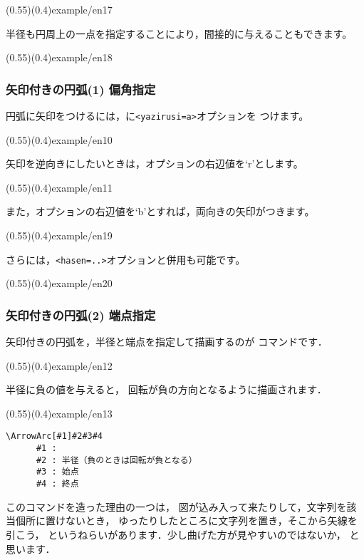 \showexample[両端の間接的指定](0.55)(0.4){example/en17}

半径も円周上の一点を指定することにより，間接的に与えることもできます。

\showexample[半径の間接的指定](0.55)(0.4){example/en18}

\subsubsection{矢印付きの円弧(1) 偏角指定}
円弧に矢印をつけるには，に\verb+<yazirusi=a>+オプションを
つけます。

\showexample[\texttt{<yazirusi=a>}](0.55)(0.4){example/en10}

矢印を逆向きにしたいときは，オプションの右辺値を`r'とします。

\showexample[\texttt{<yazirusi=r>}](0.55)(0.4){example/en11}

また，オプションの右辺値を`b'とすれば，両向きの矢印がつきます。

\showexample[\texttt{<yazirusi=b>}](0.55)(0.4){example/en19}

さらには，\verb+<hasen=..>+オプションと併用も可能です。

\showexample[\texttt{<yazirusi=b>}](0.55)(0.4){example/en20}

\subsubsection{矢印付きの円弧(2) 端点指定}
矢印付きの円弧を，半径と端点を指定して描画するのが
 コマンドです．

(0.55)(0.4){example/en12}


半径に負の値を与えると，
回転が負の方向となるように描画されます．

\showexample[回転の向き](0.55)(0.4){example/en13}


\begin{boxnote}
\begin{verbatim}
\ArrowArc[#1]#2#3#4
      #1 : 
      #2 : 半径（負のときは回転が負となる）
      #3 : 始点
      #4 : 終点
\end{verbatim}
\end{boxnote}

このコマンドを造った理由の一つは，
図が込み入って来たりして，文字列を該当個所に置けないとき，
ゆったりしたところに文字列を置き，そこから矢線を引こう，
というねらいがあります．少し曲げた方が見やすいのではないか，
と思います．

